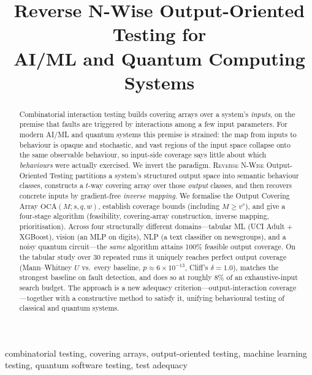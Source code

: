 \documentclass[conference]{IEEEtran}
\newif\ifanon
\newcommand{\OCA}{\ensuremath{\mathrm{OCA}}}
\newcommand{\rnwise}{\textsc{Reverse N-Wise}}
\begin{document}
\title{Reverse N-Wise Output-Oriented Testing for\\ AI/ML and Quantum Computing Systems}

\ifanon
  \author{\IEEEauthorblockN{Anonymous Author(s)}
  \IEEEauthorblockA{Affiliation withheld for double-blind review}}
\else
  \author{
  }
\fi

\maketitle

\begin{abstract}
Combinatorial interaction testing builds covering arrays over a system's
\emph{inputs}, on the premise that faults are triggered by interactions among a
few input parameters. For modern AI/ML and quantum systems this premise is
strained: the map from inputs to behaviour is opaque and stochastic, and vast
regions of the input space collapse onto the same observable behaviour, so
input-side coverage says little about which \emph{behaviours} were actually
exercised. We invert the paradigm. \rnwise{} Output-Oriented Testing partitions a
system's structured output space into semantic behaviour classes, constructs a
$t$-way covering array over those \emph{output} classes, and then recovers
concrete inputs by gradient-free \emph{inverse mapping}. We formalise the
Output Covering Array $\OCA(M;s,q,w)$, establish coverage bounds
(including $M \ge v^{s}$), and give a four-stage algorithm
(feasibility, covering-array construction, inverse mapping, prioritisation).
Across four structurally different domains---tabular ML (UCI Adult + XGBoost),
vision (an MLP on digits), NLP (a text classifier on newsgroups), and a noisy
quantum circuit---the \emph{same} algorithm attains 100\% feasible output
coverage. On the tabular study over 30 repeated runs it uniquely reaches perfect
output coverage (Mann--Whitney $U$ vs.\ every baseline, $p \approx 6\times
10^{-13}$, Cliff's $\delta = 1.0$), matches the strongest baseline on fault
detection, and does so at roughly $8\%$ of an exhaustive-input search budget.
The approach is a new adequacy criterion---output-interaction coverage---together
with a constructive method to satisfy it, unifying behavioural testing of
classical and quantum systems.
\end{abstract}

\begin{IEEEkeywords}
combinatorial testing, covering arrays, output-oriented testing, machine
learning testing, quantum software testing, test adequacy
\end{IEEEkeywords}











\end{document}
